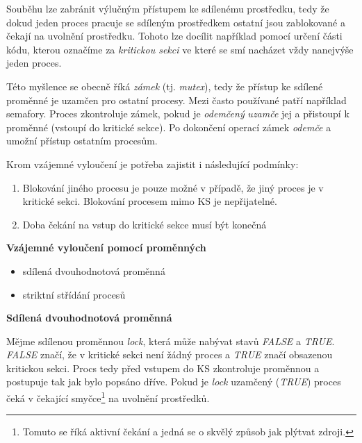 Souběhu lze zabránit výlučným přístupem ke sdílenému prostředku, tedy že dokud jeden proces pracuje se sdíleným prostředkem ostatní jsou zablokované a čekají na uvolnění prostředku. Tohoto lze docílit například pomocí určení části kódu, kterou označíme za \textit{kritickou sekci} ve které se smí nacházet vždy nanejvýše jeden proces. 

\vspace{0,5cm}

Této myšlence se obecně říká \textit{zámek} (tj. \textit{mutex}), tedy že přístup ke sdílené proměnné je uzamčen pro ostatní procesy. Mezi často používané patří například semafory. Proces zkontroluje zámek, pokud je \textit{odemčený} \textit{uzamče} jej a přistoupí k proměnné (vstoupí do kritické sekce). Po dokončení operací zámek \textit{odemče} a umožní přístup ostatním procesům. 

\vspace{0,5cm}

Krom vzájemné vyloučení je potřeba zajistit i následující podmínky:
\begin{enumerate}
    \item Blokování jiného procesu je pouze možné v případě, že jiný proces je v kritické sekci. Blokování procesem mimo KS je nepřijatelné. 
    \item Doba čekání na vstup do kritické sekce musí být konečná
\end{enumerate}

\begin{large}
    \vspace{0,5cm}
    \textbf{Vzájemné vyloučení pomocí proměnných}
\end{large}

\begin{itemize}
    \item sdílená dvouhodnotová proměnná
    \item striktní střídání procesů
\end{itemize}

\begin{large}
    \vspace{0,5cm}
    \textbf{Sdílená dvouhodnotová proměnná}
\end{large}

Mějme sdílenou proměnnou \textit{lock}, která může nabývat stavů \textit{FALSE} a \textit{TRUE}. \textit{FALSE} značí, že v kritické sekci není žádný proces a \textit{TRUE} značí obsazenou kritickou sekci. Procs tedy před vstupem do KS zkontroluje proměnnou a postupuje tak jak bylo popsáno dříve. Pokud je \textit{lock} uzamčený (\textit{TRUE}) proces čeká v čekající smyčce\footnote{Tomuto se říká aktivní čekání a jedná se o skvělý způsob jak plýtvat zdroji.} na uvolnění prostředků. 


